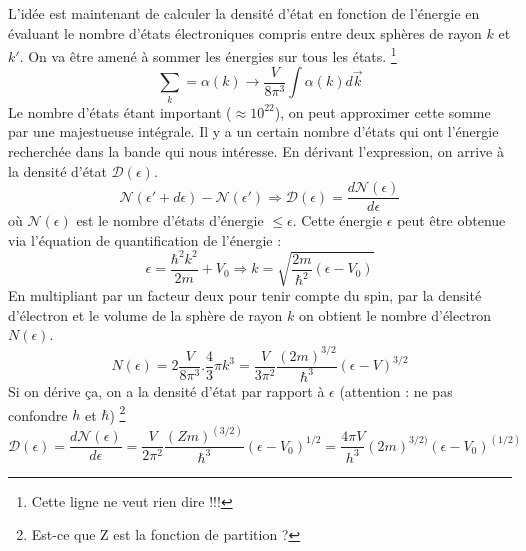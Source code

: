 L'idée est maintenant de calculer la densité d'état en fonction de 
l'énergie en évaluant le nombre d'états électroniques compris entre 
deux sphères de rayon $k$ et $k'$. On va être amené à sommer les 
énergies sur tous les états. \footnote{Cette ligne ne veut rien dire !!!}
\begin{equation}
	\sum_k = \alpha(k) \rightarrow \frac{V}{8\pi^3}\int\alpha(k)d\vec{k}
\end{equation}
Le nombre d'états étant important ($\approx 10^{22}$), on peut 
approximer cette somme par une majestueuse intégrale. Il y a un certain 
nombre d'états qui ont l'énergie recherchée dans la bande 
qui nous intéresse. En dérivant l'expression, on arrive à la densité 
d'état $\mathcal{D}(\epsilon)$.
\begin{equation}
	\mathcal{N}(\epsilon'+d\epsilon)
	-\mathcal{N}(\epsilon') \Longrightarrow \mathcal{D}(\epsilon) = 
	\frac{d\mathcal{N}(\epsilon)}{d\epsilon}
\end{equation}
où $\mathcal{N}(\epsilon)$ est le nombre d'états d'énergie $\leq 
\epsilon$. Cette énergie $\epsilon$ peut être obtenue via l'équation 
de quantification de l'énergie :
\begin{equation}
	\epsilon = \frac{\hbar^2k^2}{2m} + V_0 \Longrightarrow k = \sqrt{
		\frac{2m}{\hbar^2}(\epsilon-V_0)}
\end{equation}
En multipliant par un facteur deux pour tenir compte du spin, par la 
densité d'électron et le volume de la sphère de rayon $k$ on obtient 
le nombre d'électron $N(\epsilon)$.
\begin{equation}
	N(\epsilon) = 2 \frac{V}{8\pi^3}.\frac{4}{3}\pi k^3 = \frac{V}{3\pi^2}
	\frac{(2m)^{3/2}}{\hbar^3}(\epsilon-V)^{3/2}
\end{equation}
Si on dérive ça, on a la densité d'état par rapport à $\epsilon$ 
(attention : ne pas confondre $h$ et $\hbar$) \footnote{Est-ce que Z est
la fonction de partition ?}
\begin{equation}
	\mathcal{D}(\epsilon) = \frac{d\mathcal{N}(\epsilon)}{d\epsilon}= 
	\frac{V}{2\pi^2}\frac{(Zm)^{(3/2)}}{\hbar^3}(\epsilon-V_0)^{1/2} = 
	\frac{4\pi V}{h^3} (2m)^{3/2)}(\epsilon-V_0)^{(1/2)}
\end{equation}

